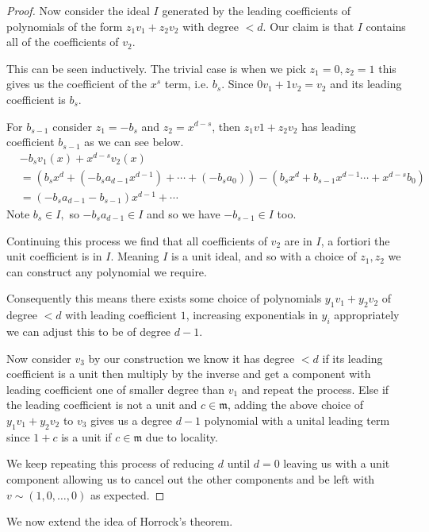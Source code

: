 \documentclass[12pt]{report}
\numberwithin{equation}{section}
\begin{document}
\begin{proof}
	Now consider the ideal $I$ generated by the leading coefficients of polynomials of the form $z_1v_1+z_2v_2$ with degree $< d.$ Our claim is that $I $ contains all of the coefficients of $v_2$.
	
	This can be seen inductively. The trivial case is when we pick $z_1=0, z_2=1$ this gives us the coefficient of the $x^s$ term, i.e. $b_s$. Since $0v_1+1v_2=v_2$ and its leading coefficient is $b_s.$
	
	For $b_{s-1}$ consider $z_1=-b_s$ and $z_2=x^{d-s}$, then $z_1v1+z_2v_2$ has leading coefficient $b_{s-1}$ as we can see below.
	\begin{align*}
		&-b_s v_1(x)+x^{d-s}v_2(x) \\
		&=(b_sx^d + (-b_sa_{d-1} x^{d-1}) + \cdots +(-b_s a_0) )- (b_s x^d + b_{s-1}x^{d-1}\cdots + x^{d-s}b_0)\\
		&= (-b_sa_{d-1}-b_{s-1})x^{d-1} + \cdots 
	\end{align*}
	Note $b_s \in I, $ so $-b_sa_{d-1} \in I$ and so we have $-b_{s-1} \in I$ too.
	
	 Continuing this process we find that all coefficients of $v_2$ are in $I$, a fortiori the unit coefficient is in $I$. Meaning $I$ is a unit ideal, and so with a choice of $z_1, z_2$ we can construct any polynomial we require.
	
	Consequently this means there exists some choice of polynomials $y_1v_1+y_2v_2$ of degree $<d$ with leading coefficient $1$, increasing exponentials in $y_i$ appropriately we can adjust this to be of degree $d-1$. 
	
	Now consider $v_3$ by our construction we know it has degree $<d$ if its leading coefficient is a unit then multiply by the inverse and get a component with leading coefficient one of smaller degree than $v_1$ and repeat the process. Else if the leading coefficient is not a unit and $c \in \mathfrak{m}$, adding the above choice of $y_1v_1+y_2v_2$ to $v_3$ gives us a degree $d-1$ polynomial with a unital leading term since $1+c$ is a unit if $c \in \mathfrak{ m }$ due to locality.
	
	We keep repeating this process of reducing $d$ until $d=0$ leaving us with a unit component allowing us to cancel out the other components and be left with $v \sim (1,0,\ldots, 0)$ as expected.
	\end{proof}
	
	We now extend the idea of Horrock's theorem.
	
\end{document}
